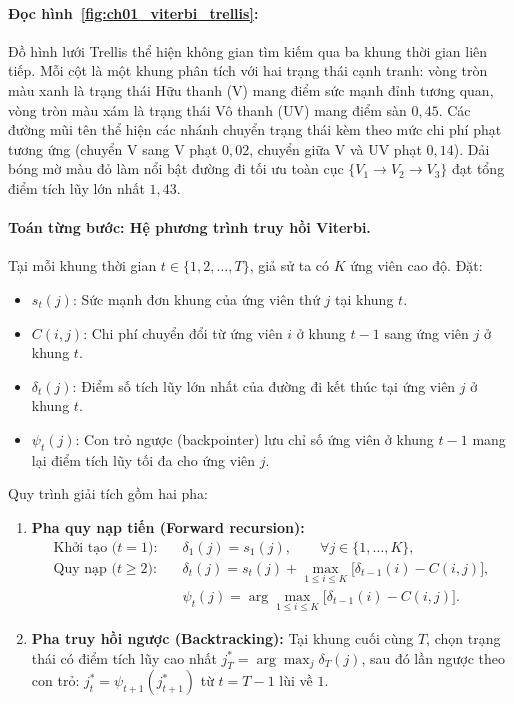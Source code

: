 \paragraph{Đọc hình~\ref{fig:ch01_viterbi_trellis}:}
Đồ hình lưới Trellis thể hiện không gian tìm kiếm qua ba khung thời gian liên tiếp. Mỗi cột là một khung phân tích với hai trạng thái cạnh tranh: vòng tròn màu xanh là trạng thái Hữu thanh (V) mang điểm sức mạnh đỉnh tương quan, vòng tròn màu xám là trạng thái Vô thanh (UV) mang điểm sàn $0{,}45$. Các đường mũi tên thể hiện các nhánh chuyển trạng thái kèm theo mức chi phí phạt tương ứng (chuyển V sang V phạt $0{,}02$, chuyển giữa V và UV phạt $0{,}14$). Dải bóng mờ màu đỏ làm nổi bật đường đi tối ưu toàn cục $\{V_1 \to V_2 \to V_3\}$ đạt tổng điểm tích lũy lớn nhất $1{,}43$.

\paragraph{Toán từng bước: Hệ phương trình truy hồi Viterbi.}
Tại mỗi khung thời gian $t \in \{1, 2, \dots, T\}$, giả sử ta có $K$ ứng viên cao độ. Đặt:
\begin{itemize}[leftmargin=1.4em]
    \item $s_t(j)$: Sức mạnh đơn khung của ứng viên thứ $j$ tại khung $t$.
    \item $C(i, j)$: Chi phí chuyển đổi từ ứng viên $i$ ở khung $t-1$ sang ứng viên $j$ ở khung $t$.
    \item $\delta_t(j)$: Điểm số tích lũy lớn nhất của đường đi kết thúc tại ứng viên $j$ ở khung $t$.
    \item $\psi_t(j)$: Con trỏ ngược (backpointer) lưu chỉ số ứng viên ở khung $t-1$ mang lại điểm tích lũy tối đa cho ứng viên $j$.
\end{itemize}
Quy trình giải tích gồm hai pha:
\begin{enumerate}[leftmargin=1.4em]
    \item \textbf{Pha quy nạp tiến (Forward recursion):}
    \begin{align*}
    \text{Khởi tạo ($t=1$):} \quad &\delta_1(j) = s_1(j), \qquad \forall j \in \{1, \dots, K\},\\[4pt]
    \text{Quy nạp ($t \ge 2$):} \quad &\delta_t(j) = s_t(j) + \max_{1 \le i \le K} \bigl[ \delta_{t-1}(i) - C(i, j) \bigr],\\[4pt]
    &\psi_t(j) = \arg\max_{1 \le i \le K} \bigl[ \delta_{t-1}(i) - C(i, j) \bigr].
    \end{align*}
    \item \textbf{Pha truy hồi ngược (Backtracking):} Tại khung cuối cùng $T$, chọn trạng thái có điểm tích lũy cao nhất $j^*_T = \arg\max_{j} \delta_T(j)$, sau đó lần ngược theo con trỏ: $j^*_t = \psi_{t+1}(j^*_{t+1})$ từ $t = T-1$ lùi về $1$.
\end{enumerate}

